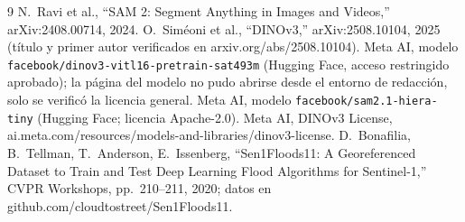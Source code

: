\documentclass[11pt,twocolumn,a4paper]{article}
\begin{document}
\begin{thebibliography}{9}\footnotesize
{} N.~Ravi et al., ``SAM 2: Segment Anything in Images and Videos,'' arXiv:2408.00714, 2024.
 O.~Sim\'eoni et al., ``DINOv3,'' arXiv:2508.10104, 2025 (t\'itulo y primer autor verificados en arxiv.org/abs/2508.10104).
 Meta AI, modelo \texttt{facebook/dinov3-vitl16-pretrain-sat493m} (Hugging Face, acceso restringido aprobado); la p\'agina del modelo no pudo abrirse desde el entorno de redacci\'on, solo se verific\'o la licencia general.
 Meta AI, modelo \texttt{facebook/sam2.1-hiera-tiny} (Hugging Face; licencia Apache-2.0).
 Meta AI, DINOv3 License, ai.meta.com/resources/models-and-libraries/dinov3-license.
 D.~Bonafilia, B.~Tellman, T.~Anderson, E.~Issenberg, ``Sen1Floods11: A Georeferenced Dataset to Train and Test Deep Learning Flood Algorithms for Sentinel-1,'' CVPR Workshops, pp.~210--211, 2020; datos en github.com/cloudtostreet/Sen1Floods11.
\end{thebibliography}
\end{document}

